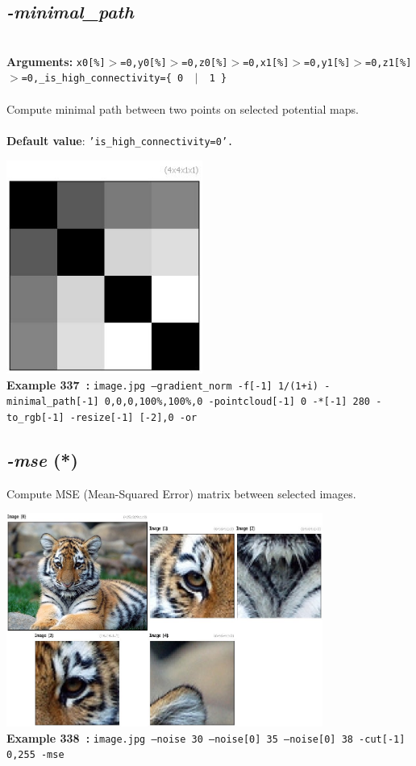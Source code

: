 \documentclass[a4paper,11pt,twoside]{book}
\begin{document}
\subsection{\emph{-minimal\_path} }\vspace*{-0.5em}
~\\\textbf{Arguments: } 
{\small \texttt{x0[\%]$>$=0,y0[\%]$>$=0,z0[\%]$>$=0,x1[\%]$>$=0,y1[\%]$>$=0,z1[\%]$>$=0,\_is\_high\_connectivity=\{ 0 ~$|$~ 1 \}}}\\~\\
Compute minimal path between two points on selected potential maps.
~\\~\\\textbf{Default value}: {\small \texttt{'is\_high\_connectivity=0'.}}
\begin{center}\includegraphics[keepaspectratio=true,height=7cm,width=\textwidth]{img/gmic_def337.jpg}\\
{\footnotesize \textbf{Example 337~:} \texttt{image.jpg --gradient\_norm -f[-1] 1/(1+i) -minimal\_path[-1] 0,0,0,100\%,100\%,0 -pointcloud[-1] 0 -*[-1] 280 -to\_rgb[-1] -resize[-1] [-2],0 -or}}
\end{center}

\subsection{\emph{-mse} (*)}\vspace*{-0.5em}
Compute MSE (Mean-Squared Error) matrix between selected images.
\begin{center}\includegraphics[keepaspectratio=true,height=7cm,width=\textwidth]{img/gmic_def338.jpg}\\
{\footnotesize \textbf{Example 338~:} \texttt{image.jpg --noise 30 --noise[0] 35 --noise[0] 38 -cut[-1] 0,255 -mse}}
\end{center}
\end{document}
